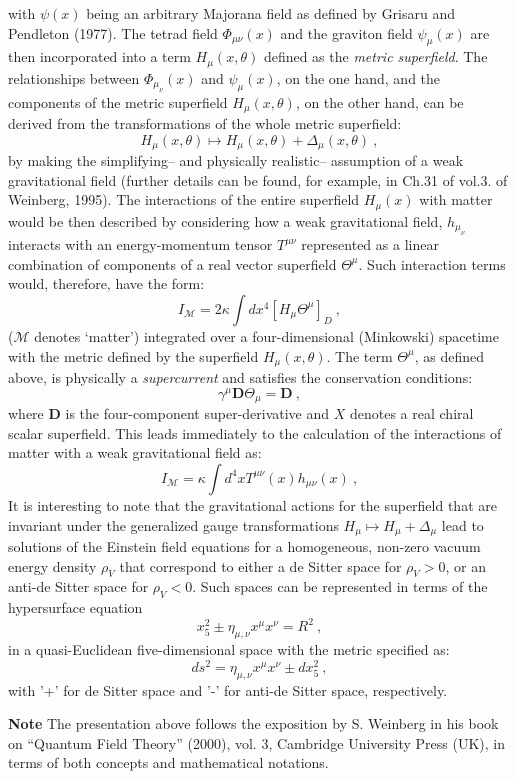 \documentclass[12pt]{article}
\theoremstyle{plain}
\theoremstyle{definition}
\theoremstyle{plain}
\numberwithin{equation}{section}
\begin{document}
with $\psi(x)$ being an arbitrary Majorana field as defined by
Grisaru and Pendleton (1977). The tetrad field $\Phi _{\mu
\nu}(x)$ and the graviton field $\psi _\mu(x)$ are then
incorporated into a term $H_\mu (x,\theta)$ defined as the
\emph{metric superfield}. The relationships between $\Phi _{\mu _
\nu}(x)$ and $\psi _\mu(x)$, on the one hand, and the components
of the metric superfield $H_\mu (x,\theta)$, on the other hand,
can be derived from the transformations of the whole metric
superfield:
\begin{equation}
H_\mu (x,\theta)\longmapsto H_\mu (x,\theta)+ \Delta _\mu
(x,\theta)~,
\end{equation}
by making the simplifying-- and physically realistic-- assumption
of a weak gravitational field (further details can be found, for
example, in Ch.31 of vol.3. of Weinberg, 1995). The interactions
of the entire superfield $H_\mu (x)$ with matter would be then
described by considering how a weak gravitational field,
$h_{\mu_\nu}$ interacts with an energy-momentum tensor $T^{\mu
\nu}$ represented as a linear combination of components of a real
vector superfield $\Theta^\mu$.  Such interaction terms would,
therefore, have the form:
\begin{equation}
 I_{\mathcal M}= 2\kappa \int dx^4 [H_\mu \Theta^\mu]_D ~,
\end{equation}
($\mathcal M$ denotes `matter') integrated over a four-dimensional
(Minkowski) spacetime with the metric defined by the superfield
$H_\mu (x,\theta)$. The term $\Theta^\mu$, as defined above, is
physically a \emph{supercurrent} and satisfies the conservation
conditions:
\begin{equation}
\gamma^\mu \mathbf{D} \Theta _\mu = \mathbf{D} ~,
\end{equation}
where $\mathbf{D}$ is the four-component super-derivative and $X$
denotes a real chiral scalar superfield. This leads immediately to
the calculation of the interactions of matter with a weak
gravitational field as:
\begin{equation}
I_{\mathcal M} = \kappa \int d^4 x T^{\mu \nu}(x)h_{\mu \nu}(x) ~,
\end{equation}
It is interesting to note that the gravitational actions for the
superfield that are invariant under the generalized gauge
transformations $H_\mu \longmapsto H _\mu  + \Delta _\mu$ lead to
solutions of the Einstein field equations for a homogeneous,
non-zero vacuum energy density $\rho _V$ that correspond to either
a de Sitter space for $\rho _V>0$, or an anti-de Sitter space for
$\rho _V <0$. Such spaces can be represented in terms of the
hypersurface equation
\begin{equation}
x^2_5 \pm \eta _{\mu,\nu} x^\mu x^\nu = R^2 ~,
\end{equation}
in a quasi-Euclidean five-dimensional space with the metric
specified as:
\begin{equation}
ds^2 = \eta _{\mu,\nu} x^\mu x^\nu \pm dx^2_5 ~,
\end{equation}
with '+' for de Sitter space and '-' for anti-de Sitter space,
respectively.

\textbf{Note}
The presentation above follows the exposition by S. Weinberg in his book
on ``Quantum Field Theory'' (2000), vol. 3, Cambridge University Press (UK),
in terms of both concepts and mathematical notations.

\end{document}
